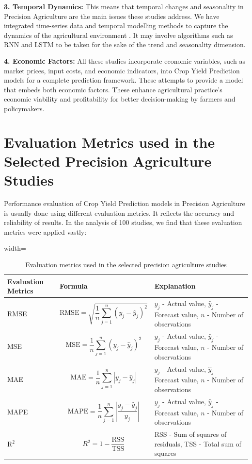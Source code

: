 \documentclass[conference]{IEEEtran}
\begin{document}
\textbf{3. Temporal Dynamics:}
This means that temporal changes and seasonality in Precision Agriculture are the main issues these studies address. We have integrated time-series data and temporal modelling methods to capture the dynamics of the agricultural environment \cite{b76}. It may involve algorithms such as RNN and LSTM to be taken for the sake of the trend and seasonality dimension.

\textbf{4. Economic Factors:}
All these studies incorporate economic variables, such as market prices, input costs, and economic indicators, into Crop Yield Prediction models for a complete prediction framework. These attempts to provide a model that embeds both economic factors. These enhance agricultural practice's economic viability and profitability for better decision-making by farmers and policymakers.

\section{Evaluation Metrics used in the Selected Precision Agriculture Studies}

Performance evaluation of Crop Yield Prediction models in Precision Agriculture is usually done using different evaluation metrics. It reflects the accuracy and reliability of results. In the analysis of 100 studies, we find that these evaluation metrics were applied vastly:

\begin{table}[htbp]
\centering
\caption{Evaluation metrics used in the selected precision agriculture studies}
\begin{adjustbox}{width=\textwidth}
\begin{tabular}{|p{3.5cm}|p{5.5cm}|p{5cm}|}
\hline
\textbf{Evaluation Metrics} & \textbf{Formula} & \textbf{Explanation} \\
\hline
RMSE & 
\[
\text{RMSE} = \sqrt{\frac{1}{n}\sum_{j=1}^{n}( y_j - \hat{y}_j )^2}
\]
& 
$ y_j $ - Actual value,  
$ \hat{y}_j $ - Forecast value,  
$ n $ - Number of observations \\
\hline
MSE & 
\[
\text{MSE} = \frac{1}{n}\sum_{j=1}^{n}( y_j - \hat{y}_j )^2
\]
& 
$ y_j $ - Actual value,  
$ \hat{y}_j $ - Forecast value,  
$ n $ - Number of observations \\
\hline
MAE & 
\[
\text{MAE} = \frac{1}{n}\sum_{j=1}^{n} \left| y_j - \hat{y}_j \right|
\]
& 
$ y_j $ - Actual value,  
$ \hat{y}_j $ - Forecast value,  
$ n $ - Number of observations \\
\hline
MAPE & 
\[
\text{MAPE} = \frac{1}{n}\sum_{j=1}^{n} \left| \frac{y_j - \hat{y}_j}{y_j} \right|
\]
& 
$ y_j $ - Actual value,  
$ \hat{y}_j $ - Forecast value,  
$ n $ - Number of observations \\
\hline
R\(^2\) & 
\[
R^2 = 1 - \frac{\text{RSS}}{\text{TSS}}
\]
& 
RSS - Sum of squares of residuals,  
TSS - Total sum of squares \\
\hline
\end{tabular}
\end{adjustbox}
\label{table:performance_metrics}
\end{table}
\end{document}
